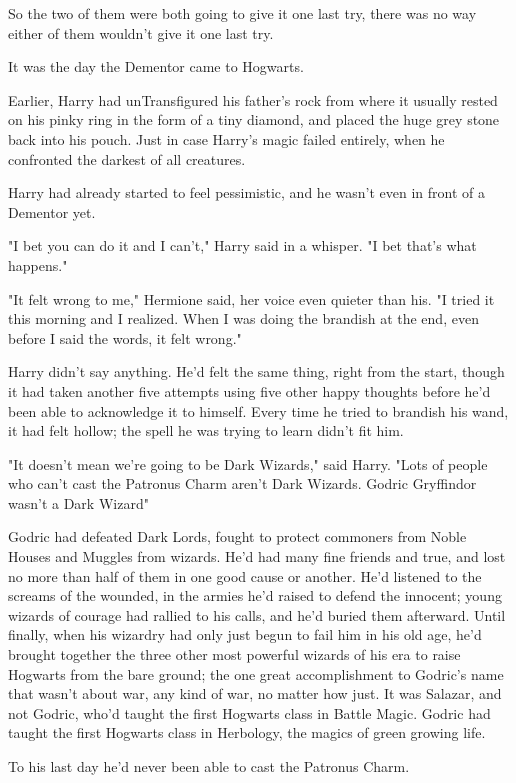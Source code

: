 So the two of them were both going to give it one last try, there was no way
either of them wouldn't give it one last try.

It was the day the Dementor came to Hogwarts.

Earlier, Harry had unTransfigured his father's rock from where it usually
rested on his pinky ring in the form of a tiny diamond, and placed the huge
grey stone back into his pouch. Just in case Harry's magic failed entirely,
when he confronted the darkest of all creatures.

Harry had already started to feel pessimistic, and he wasn't even in front of a
Dementor yet.

"I bet you can do it and I can't," Harry said in a whisper. "I bet that's what
happens."

"It felt wrong to me," Hermione said, her voice even quieter than his. "I tried
it this morning and I realized. When I was doing the brandish at the end, even
before I said the words, it felt wrong."

Harry didn't say anything. He'd felt the same thing, right from the start,
though it had taken another five attempts using five other happy thoughts
before he'd been able to acknowledge it to himself. Every time he tried to
brandish his wand, it had felt hollow; the spell he was trying to learn didn't
fit him.

"It doesn't mean we're going to be Dark Wizards," said Harry. "Lots of people
who can't cast the Patronus Charm aren't Dark Wizards. Godric Gryffindor wasn't
a Dark Wizard{\el}"

Godric had defeated Dark Lords, fought to protect commoners from Noble Houses
and Muggles from wizards. He'd had many fine friends and true, and lost no more
than half of them in one good cause or another. He'd listened to the screams of
the wounded, in the armies he'd raised to defend the innocent; young wizards of
courage had rallied to his calls, and he'd buried them afterward. Until
finally, when his wizardry had only just begun to fail him in his old age, he'd
brought together the three other most powerful wizards of his era to raise
Hogwarts from the bare ground; the one great accomplishment to Godric's name
that wasn't about war, any kind of war, no matter how just. It was Salazar, and
not Godric, who'd taught the first Hogwarts class in Battle Magic. Godric had
taught the first Hogwarts class in Herbology, the magics of green growing life.

To his last day he'd never been able to cast the Patronus Charm.

